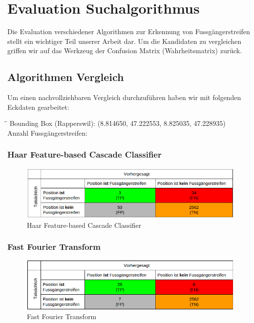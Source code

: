 \section{Evaluation Suchalgorithmus}
Die Evaluation verschiedener Algorithmen zur Erkennung von Fussgängerstreifen stellt ein wichtiger Teil unserer Arbeit dar. Um die Kandidaten zu vergleichen griffen wir auf das Werkzeug der Confusion Matrix (Wahrheitsmatrix) zurück.

\subsection{Algorithmen Vergleich}
Um einen nachvollziehbaren Vergleich durchzuführen haben wir mit folgenden Eckdaten gearbeitet:
\begin{tabbing}[H]
    \hspace*{6cm}\=\hspace*{6cm}\= \kill
    Bounding Box (Rapperswil): \> (8.814650, 47.222553, 8.825035, 47.228935) \\
    Anzahl Fussgängerstreifen:  \\
\end{tabbing}

\subsubsection{Haar Feature-based Cascade Classifier}
\begin{figure}[H]
\includegraphics[width=\textwidth]{images/haar_conf.png}
\caption[Haar Feature-based Cascade Classifier]{Haar Feature-based Cascade Classifier}
\end{figure}
\subsubsection{Fast Fourier Transform}	
\begin{figure}[H]
\includegraphics[width=\textwidth]{images/fast_fourier_conf.png}
\caption[Fast Fourier Transform]{Fast Fourier Transform}
\end{figure}
